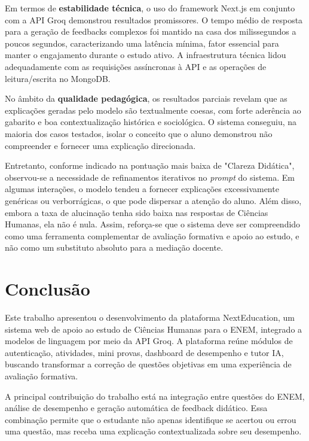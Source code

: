 \documentclass[
12pt,
openright,
oneside,
a4paper,
brazil
]{abntex2}
\begin{document}
Em termos de \textbf{estabilidade técnica}, o uso do framework Next.js em conjunto com a API Groq demonstrou resultados promissores. O tempo médio de resposta para a geração de feedbacks complexos foi mantido na casa dos milissegundos a poucos segundos, caracterizando uma latência mínima, fator essencial para manter o engajamento durante o estudo ativo. A infraestrutura técnica lidou adequadamente com as requisições assíncronas à API e as operações de leitura/escrita no MongoDB.

No âmbito da \textbf{qualidade pedagógica}, os resultados parciais revelam que as explicações geradas pelo modelo são textualmente coesas, com forte aderência ao gabarito e boa contextualização histórica e sociológica. O sistema conseguiu, na maioria dos casos testados, isolar o conceito que o aluno demonstrou não compreender e fornecer uma explicação direcionada.

Entretanto, conforme indicado na pontuação mais baixa de "Clareza Didática", observou-se a necessidade de refinamentos iterativos no \textit{prompt} do sistema. Em algumas interações, o modelo tendeu a fornecer explicações excessivamente genéricas ou verborrágicas, o que pode dispersar a atenção do aluno. Além disso, embora a taxa de alucinação tenha sido baixa nas respostas de Ciências Humanas, ela não é nula. Assim, reforça-se que o sistema deve ser compreendido como uma ferramenta complementar de avaliação formativa e apoio ao estudo, e não como um substituto absoluto para a mediação docente.


\chapter{Conclusão}

Este trabalho apresentou o desenvolvimento da plataforma NextEducation, um sistema web de apoio ao estudo de Ciências Humanas para o ENEM, integrado a modelos de linguagem por meio da API Groq. A plataforma reúne módulos de autenticação, atividades, mini provas, dashboard de desempenho e tutor IA, buscando transformar a correção de questões objetivas em uma experiência de avaliação formativa.

A principal contribuição do trabalho está na integração entre questões do ENEM, análise de desempenho e geração automática de feedback didático. Essa combinação permite que o estudante não apenas identifique se acertou ou errou uma questão, mas receba uma explicação contextualizada sobre seu desempenho.
\end{document}
